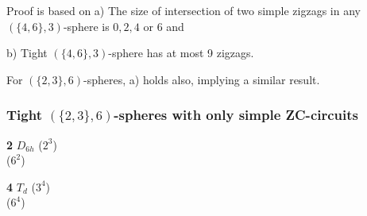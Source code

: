 \documentclass{beamer}
\begin{document}
\begin{frame}
Proof is based on a) The size of intersection of two simple
zigzags in any $(\{4,6\},3)$-sphere is $0,2,4$ or $6$ and 

b) Tight
$(\{4,6\},3)$-sphere has  at most 9 zigzags.
\vspace{1.5mm}

For $(\{2,3\},6)$-spheres, a) holds also,  implying a similar
result.
\end{frame}

\begin{frame}\frametitle{Tight $(\{2,3\},6)$-spheres with only simple
ZC-circuits}\vspace{-3mm}




\begin{center}
\vspace{-2.3mm}
\begin{minipage}[b]{25mm}\centering
{}\par
{\bf 2} $D_{6h}$ ($2^3$)\\($6^2$) \end{minipage}
\begin{minipage}[b]{21mm}\centering
{}\par
{\bf 4} $T_{d}$ ($3^4$)\\($6^4$)\end{minipage}
\begin{minipage}[b]{22mm}\centering

\end{minipage}
\end{center}
\end{frame}
\end{document}
